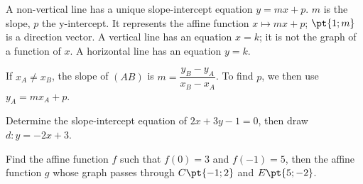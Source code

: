\begin{keypoint}[Definitions]
A non-vertical line has a unique slope-intercept equation $y=mx+p$. $m$ is the slope, $p$ the y-intercept. It represents the affine function $x\mapsto mx+p$; $\pt{1;m}$ is a direction vector.
A vertical line has an equation $x=k$; it is not the graph of a function of $x$. A horizontal line has an equation $y=k$.
\end{keypoint}
\begin{keypoint}
If $x_A\ne x_B$, the slope of $(AB)$ is $m=\dfrac{y_B-y_A}{x_B-x_A}$. To find $p$, we then use $y_A=mx_A+p$.
\end{keypoint}
\begin{example}Determine the slope-intercept equation of $2x+3y-1=0$, then draw $d:y=-2x+3$.\end{example}
\begin{center}\end{center}
\begin{example}Find the affine function $f$ such that $f(0)=3$ and $f(-1)=5$, then the affine function $g$ whose graph passes through $C\pt{-1;2}$ and $E\pt{5;-2}$.\end{example}

